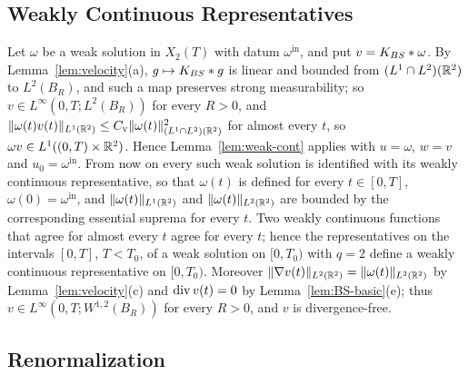 \subsection{Weakly Continuous Representatives}
\label{sec:weak-rep}

Let $\omega$ be a weak solution in $X_2(T)$ with datum
$\omega^{\mathrm{in}}$, and put $v=K_{BS}\ast\omega$. By
Lemma~\ref{lem:velocity}(a), $g\mapsto K_{BS}\ast g$ is linear and bounded from
$(L^1\cap L^2)(\mathbb{R}^2)$ to $L^2(B_R)$, and such a map preserves strong
measurability; so $v\in L^\infty(0,T;L^2(B_R))$ for every
$R>0$, and $\|\omega(t)v(t)\|_{L^1(\mathbb{R}^2)}\le C_{\mathrm v}\|\omega(t)\|_{(L^1\cap L^2)(\mathbb{R}^2)}^2$ for
almost every $t$, so $\omega v\in L^1((0,T)\times\mathbb{R}^2)$. Hence Lemma~\ref{lem:weak-cont} applies with
$u=\omega$, $w=v$ and $u_0=\omega^{\mathrm{in}}$. From now on every such weak
solution is identified with its weakly continuous representative, so that
$\omega(t)$ is defined for every $t\in[0,T]$, $\omega(0)=\omega^{\mathrm{in}}$,
and $\|\omega(t)\|_{L^1(\mathbb{R}^2)}$ and $\|\omega(t)\|_{L^2(\mathbb{R}^2)}$ are bounded by the
corresponding essential suprema for every $t$. Two weakly continuous functions
that agree for almost every $t$ agree for every $t$; hence the representatives
on the intervals $[0,T]$, $T<T_0$, of a weak solution on $[0,T_0)$ with $q=2$
define a weakly continuous representative on $[0,T_0)$. Moreover
$\|\nabla v(t)\|_{L^2(\mathbb{R}^2)}=\|\omega(t)\|_{L^2(\mathbb{R}^2)}$
by Lemma~\ref{lem:velocity}(c) and $\operatorname{div} v(t)=0$ by
Lemma~\ref{lem:BS-basic}(e); thus $v\in L^\infty(0,T;W^{1,2}(B_R))$ for every
$R>0$, and $v$ is divergence-free.

\subsection{Renormalization}

